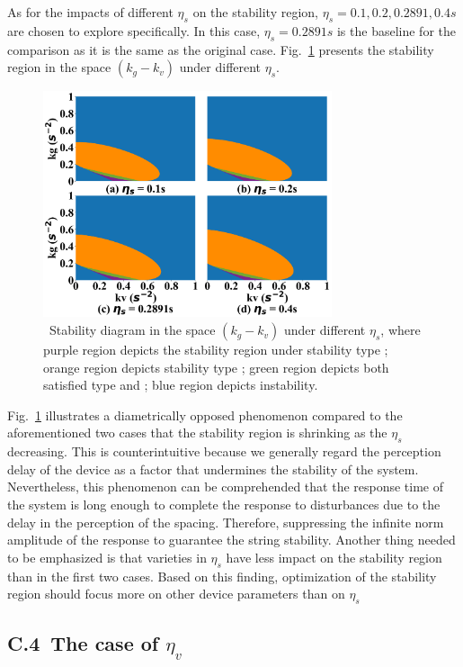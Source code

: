 \documentclass[journal]{IEEEtran}
\begin{document}
As for the impacts of different $\eta_s$ on the stability region, $\eta_s=0.1,0.2,0.2891,0.4s$ are chosen to explore specifically. In this case, $\eta_s=0.2891s$ is the baseline for the comparison as it is the same as the original case. Fig.~\ref{fig10} presents the stability region in the space $(k_g-k_v)$ under different $\eta_s$.

\begin{figure}
  \centering
  \includegraphics[width=8.5cm]{figs/fig10.png}
  \caption{~Stability diagram in the space $(k_g-k_v)$ under different $\eta_s$, where purple region depicts the stability region under stability type \uppercase\expandafter{}; orange region depicts stability type \uppercase\expandafter{}; green region depicts both satisfied type \uppercase\expandafter{} and \uppercase\expandafter{}; blue region depicts instability.}
  \label{fig10}
\end{figure}

Fig.~\ref{fig10} illustrates a diametrically opposed phenomenon compared to the aforementioned two cases that the stability region is shrinking as the $\eta_s$ decreasing. This is counterintuitive because we generally regard the perception delay of the device as a factor that undermines the stability of the system. Nevertheless, this phenomenon can be comprehended that the response time of the system is long enough to complete the response to disturbances due to the delay in the perception of the spacing. Therefore, suppressing the infinite norm amplitude of the response to guarantee the string stability. Another thing needed to be emphasized is that varieties in $\eta_s$ have less impact on the stability region than in the first two cases. Based on this finding, optimization of the stability region should focus more on other device parameters than on $\eta_s$


\subsection*{C.4~The case of $\eta_v$}
\end{document}
